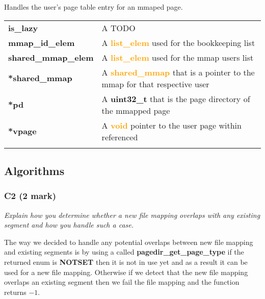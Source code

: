 \documentclass{report}
\newcommand{\question}[1]{\textit{#1} \ }
\newcommand{\fun}[1]{\textcolor{Emerald}{\textbf{#1}}}
\newcommand{\file}[1]{\textcolor{YellowGreen}{\textbf{#1}}}
\newcommand{\struct}[1]{\textcolor{orange}{\textbf{#1}}}
\newcommand{\var}[1]{\textcolor{RoyalPurple}{\textbf{#1}}}
\newcommand{\const}[1]{\textcolor{BrickRed}{\textbf{#1}}}
\newcommand{\pintoscode}[4]{}
\newcommand{\pintosfile}[3]{\pintoscode{#1}{#2}{\file{#3}}{#3}}
\begin{document}
{				%
				\pintosfile{60}{67}{mmap.c}
				Handles the user's page table entry for an mmaped page. \\
				\begin{center}
					\begin{tabular}{l p{10cm}}
							\vspace*{2mm}
							\var{is\_lazy}            & A TODO \\ \vspace*{2mm}
							\var{mmap\_id\_elem}      & A \struct{list\_elem} used for the bookkeeping list \\ \vspace*{2mm}
							\var{shared\_mmap\_elem}  & A \struct{list\_elem} used for the mmap users list \\ \vspace*{2mm}
							\var{*shared\_mmap}       & A \struct{shared\_mmap} that is a pointer to the mmap for that respective user \\ \vspace*{2mm}
							\var{*pd}                 & A \const{uint32\_t} that is the page directory of the mmapped page \\ \vspace*{2mm}
							\var{*vpage}              & A \struct{void} pointer to the user page within referenced \\ \vspace*{2mm}
					\end{tabular}
				\end{center}

		\subsection*{Algorithms}
			\subsubsection*{C2 (2 mark)}
				\question{Explain how you determine whether a new file mapping overlaps 
				with any existing segment and how you handle such a case.}

				The way we decided to handle any potential overlaps between new file 
				mapping and existing segments is by using a called \fun{pagedir\_get\_page\_type}
				if the returned enum is \var{NOTSET} 
				then it is not in use yet and as a result it can be used for a new file mapping. 
				Otherwise if we detect that the new file mapping overlaps an existing segment then we 
				fail the file mapping and the function returns \const{$-1$}.

}
\end{document}
